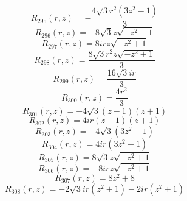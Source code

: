 \documentclass[11pt,a4paper]{article}
\begin{document}
\begin{equation}
R_{295}(r,z)=- \frac{4 \sqrt{3} r^{2} \left(3 z^{2} - 1\right)}{3}
\label{eq:cat-rational-295}
\end{equation}
\begin{equation}
R_{296}(r,z)=- 8 \sqrt{3} z \sqrt{- z^{2} + 1}
\label{eq:cat-rational-296}
\end{equation}
\begin{equation}
R_{297}(r,z)=8 i r z \sqrt{- z^{2} + 1}
\label{eq:cat-rational-297}
\end{equation}
\begin{equation}
R_{298}(r,z)=\frac{8 \sqrt{3} r^{2} z \sqrt{- z^{2} + 1}}{3}
\label{eq:cat-rational-298}
\end{equation}
\begin{equation}
R_{299}(r,z)=\frac{16 \sqrt{3} i r}{3}
\label{eq:cat-rational-299}
\end{equation}
\begin{equation}
R_{300}(r,z)=\frac{4 r^{2}}{3}
\label{eq:cat-rational-300}
\end{equation}
\begin{equation}
R_{301}(r,z)=- 4 \sqrt{3} \left(z - 1\right) \left(z + 1\right)
\label{eq:cat-rational-301}
\end{equation}
\begin{equation}
R_{302}(r,z)=4 i r \left(z - 1\right) \left(z + 1\right)
\label{eq:cat-rational-302}
\end{equation}
\begin{equation}
R_{303}(r,z)=- 4 \sqrt{3} \left(3 z^{2} - 1\right)
\label{eq:cat-rational-303}
\end{equation}
\begin{equation}
R_{304}(r,z)=4 i r \left(3 z^{2} - 1\right)
\label{eq:cat-rational-304}
\end{equation}
\begin{equation}
R_{305}(r,z)=8 \sqrt{3} z \sqrt{- z^{2} + 1}
\label{eq:cat-rational-305}
\end{equation}
\begin{equation}
R_{306}(r,z)=- 8 i r z \sqrt{- z^{2} + 1}
\label{eq:cat-rational-306}
\end{equation}
\begin{equation}
R_{307}(r,z)=8 z^{2} + 8
\label{eq:cat-rational-307}
\end{equation}
\begin{equation}
R_{308}(r,z)=- 2 \sqrt{3} i r \left(z^{2} + 1\right) - 2 i r \left(z^{2} + 1\right)
\label{eq:cat-rational-308}
\end{equation}
\end{document}
